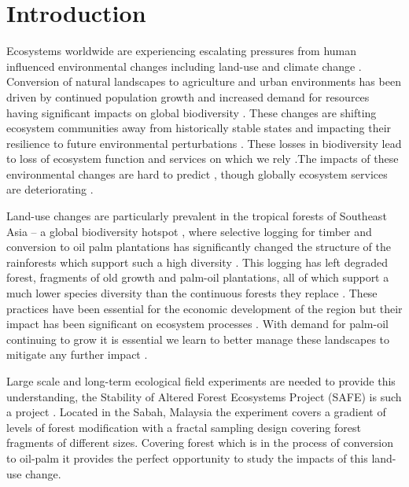 
\section{Introduction}

Ecosystems worldwide are experiencing escalating pressures from human influenced environmental changes including land-use and climate change \citep{Hautier2015}. Conversion of natural landscapes to agriculture and urban environments has been driven by continued population growth and increased demand for resources \citep{Green2005, Foley2005} having significant impacts on global biodiversity \citep{Pimm1995}. These changes are shifting ecosystem communities away from historically stable states \citep{Hautier2015} and impacting their resilience to future environmental perturbations \citep{Oliver2015}. These losses in biodiversity lead to loss of ecosystem function and services on which we rely \citep{Diaz2006, MillenniumEcosystemAssessment2005}.The impacts of these environmental changes are hard to predict \citep{Carpenter2009}, though globally ecosystem services are deteriorating \citep{Mace2012}.

Land-use changes are particularly prevalent in the tropical forests of Southeast Asia – a global biodiversity hotspot \citep{DeBruyn2014},  where selective logging for timber and conversion to oil palm plantations has significantly changed the structure of the rainforests which support such a high diversity \citep{Gibson2011}. This logging has left degraded forest, fragments of old growth and palm-oil plantations, all of which support a much lower species diversity than the continuous forests they replace \citep{Fitzherbert2008, Haddad2015} . These practices have been essential for the economic development of the region \citep{Basiron2007} but their impact has been significant on ecosystem processes \citep{Koh2011, Schleuning2011, Ewers2015}.  With demand for palm-oil continuing to grow it is essential we learn to better manage these landscapes to mitigate any further impact \citep{Turner2008}.

Large scale and long-term ecological field experiments are needed to provide this understanding, the Stability of Altered Forest Ecosystems Project (SAFE) is such a project \citep{Ewers2011}. Located in the Sabah, Malaysia the experiment covers a gradient of levels of forest modification with a fractal sampling design covering forest fragments of different sizes. Covering forest which is in the process of conversion to oil-palm it provides the perfect opportunity to study the impacts of this land-use change.

